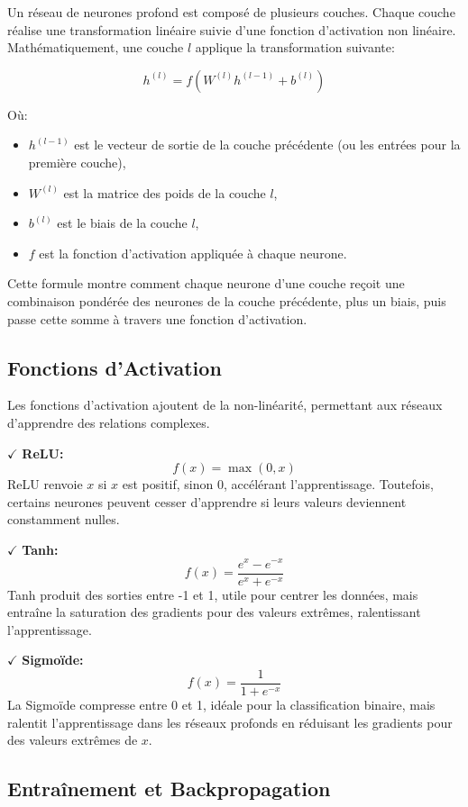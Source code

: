 Un réseau de neurones profond est composé de plusieurs couches. Chaque couche réalise une transformation linéaire suivie d'une fonction d'activation non linéaire. Mathématiquement, une couche \( l \) applique la transformation suivante:

\[
h^{(l)} = f(W^{(l)} h^{(l-1)} + b^{(l)})
\]

Où:
\begin{itemize}
    \item \( h^{(l-1)} \) est le vecteur de sortie de la couche précédente (ou les entrées pour la première couche),
    \item \( W^{(l)} \) est la matrice des poids de la couche \( l \),
    \item \( b^{(l)} \) est le biais de la couche \( l \),
    \item \( f \) est la fonction d'activation appliquée à chaque neurone.
\end{itemize}

Cette formule montre comment chaque neurone d'une couche reçoit une combinaison pondérée des neurones de la couche précédente, plus un biais, puis passe cette somme à travers une fonction d'activation.
\subsection{Fonctions d'Activation}

Les fonctions d'activation ajoutent de la non-linéarité, permettant aux réseaux d'apprendre des relations complexes.

\textbf{\(\checkmark\)} \textbf{ReLU:} 
\[ f(x) = \max(0, x) \]
ReLU renvoie \( x \) si \( x \) est positif, sinon 0, accélérant l'apprentissage. Toutefois, certains neurones peuvent cesser d'apprendre si leurs valeurs deviennent constamment nulles.

\textbf{\(\checkmark\)} \textbf{Tanh:} 
\[ f(x) = \frac{e^x - e^{-x}}{e^x + e^{-x}} \]
Tanh produit des sorties entre -1 et 1, utile pour centrer les données, mais entraîne la saturation des gradients pour des valeurs extrêmes, ralentissant l'apprentissage.

\textbf{\(\checkmark\)} \textbf{Sigmoïde:} 
\[ f(x) = \frac{1}{1 + e^{-x}} \]
La Sigmoïde compresse entre 0 et 1, idéale pour la classification binaire, mais ralentit l'apprentissage dans les réseaux profonds en réduisant les gradients pour des valeurs extrêmes de \( x \).


\subsection{Entraînement et Backpropagation}

